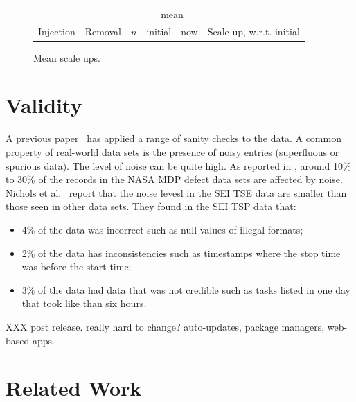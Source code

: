 \documentclass{sig-alternate}
\newcommand{\bi}{\begin{itemize}[leftmargin=0.4cm]}
\newcommand{\ei}{\end{itemize}}
\def\baselinestretch{1}
\begin{document}
\begin{figure}[!t]
\renewcommand{\baselinestretch}{0.7}
\scriptsize
\begin{center}
\begin{tabular}{l@{~~}|l@{~}|r@{~}|r@{~}r@{~}|r@{~}l}
           \multicolumn{2}{c}{~}                 &  &\multicolumn{2}{c|}{mean}\\
  Injection&   Removal& $n$ & initial & now & \multicolumn{2}{l}{Scale up, w.r.t. initial}

\end{tabular}
\end{center}
\caption{Mean  scale ups.}
\label{fig:scale90}
\end{figure}


 

\section{Validity} 
A previous paper~\cite{shirai14} has applied a range of sanity checks to the data.
A common property of real-world data sets is the presence
of noisy entries (superfluous  or spurious data). 
The level of noise can be quite high. As reported
in \cite{shepperd12}, around
10\% to 30\%
of the records in the NASA MDP defect data sets are
affected by noise. Nichols et al.~\cite{shirai14}  report that
the noise levesl in the SEI TSE data are smaller than those seen
in other data sets. They found in the SEI TSP data that:\bi 
\item
4\% of the data was incorrect such as  null values of illegal formats;
\item  2\% of the data has inconsistencies such as timestamps
where the stop time was before the start time;
\item 3\% of the data had data that was not credible
such as tasks listed in one day that took like than six hours.
\ei 


XXX post release. really hard to change? auto-updates, package managers, web-based apps. 
 
\section{Related Work}
\end{document}

